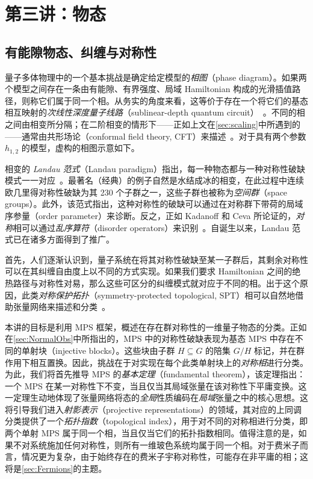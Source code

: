 \section{第三讲：物态}
\label{sec:PhasesOfMatter}
\subsection{有能隙物态、纠缠与对称性}
量子多体物理中的一个基本挑战是确定给定模型的\emph{相图}（phase diagram）。如果两个模型之间存在一条由有能隙、有界强度、局域 Hamiltonian 构成的光滑插值路径，则称它们属于同一个相。从务实的角度来看，这等价于存在一个将它们的基态相互映射的\emph{次线性深度量子线路}（sublinear-depth quantum circuit）~\cite{Bravyi2006,Hastings2010}。不同的相之间由相变所分隔；在二阶相变的情形下——正如上文在\cref{sec:scaling}中所遇到的——通常由共形场论（conformal field theory, CFT）来描述~\cite{DiFrancesco1997}。对于具有两个参数 $h_{1,2}$ 的模型，虚构的相图示意如下。

相变的 \emph{Landau 范式}（Landau paradigm）指出，每一种物态都与一种对称性破缺模式一一对应~\cite{Landau1937}。最著名（经典）的例子自然是水结成冰的相变，在此过程中连续欧几里得对称性破缺为其 230 个子群之一，这些子群也被称为\emph{空间群}（space groups）。此外，该范式指出，这种对称性的破缺可以通过在对称群下带荷的局域序参量（order parameter）来诊断。反之，正如 Kadanoff 和 Ceva 所论证的，\emph{对称}相可以通过\emph{乱序算符}（disorder operators）来识别~\cite{Kadanoff1970}。自诞生以来，Landau 范式已在诸多方面得到了推广。

首先，人们逐渐认识到，量子系统在将其对称性破缺至某一子群后，其剩余对称性可以在其纠缠自由度上以不同的方式实现。如果我们要求 Hamiltonian 之间的绝热路径与对称性对易，那么这些可区分的纠缠模式就对应于不同的相。出于这个原因，此类\emph{对称保护拓扑}（symmetry-protected topological, SPT）相可以自然地借助张量网络来描述和分类~\cite{Chen2010,Chen2011,Schuch2011,GarreRubio2022}。

本讲的目标是利用 MPS 框架，概述在存在群对称性的一维量子物态的分类。正如在\cref{sec:NormalObs}中所指出的，MPS 中的对称性破缺表现为基态 MPS 中存在不同的单射块（injective blocks）。这些块由子群 $H\subseteq G$ 的陪集 $G/H$ 标记，并在群作用下相互置换。因此，挑战在于对实现在每个此类单射块上的\emph{对称相}进行分类。为此，我们将首先推导 MPS 的\emph{基本定理}（fundamental theorem），该定理指出：一个 MPS 在某一对称性下不变，当且仅当其局域张量在该对称性下平庸变换。这一定理生动地体现了张量网络将态的\emph{全局}性质编码在\emph{局域}张量之中的核心思想。这将引导我们进入\emph{射影表示}（projective representations）的领域，其对应的上同调分类提供了一个\emph{拓扑指数}（topological index），用于对不同的对称相进行分类，即两个单射 MPS 属于同一个相，当且仅当它们的拓扑指数相同。值得注意的是，如果不对系统施加任何对称性，则所有一维玻色系统均属于同一个相。对于费米子而言，情况更为复杂，由于始终存在的费米子宇称对称性，可能存在非平庸的相；这将是\cref{sec:Fermions}的主题。

